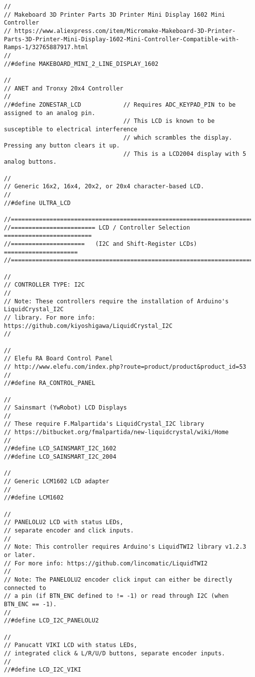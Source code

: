 \begin{lstlisting}
//
// Makeboard 3D Printer Parts 3D Printer Mini Display 1602 Mini Controller
// https://www.aliexpress.com/item/Micromake-Makeboard-3D-Printer-Parts-3D-Printer-Mini-Display-1602-Mini-Controller-Compatible-with-Ramps-1/32765887917.html
//
//#define MAKEBOARD_MINI_2_LINE_DISPLAY_1602

//
// ANET and Tronxy 20x4 Controller
//
//#define ZONESTAR_LCD            // Requires ADC_KEYPAD_PIN to be assigned to an analog pin.
                                  // This LCD is known to be susceptible to electrical interference
                                  // which scrambles the display.  Pressing any button clears it up.
                                  // This is a LCD2004 display with 5 analog buttons.

//
// Generic 16x2, 16x4, 20x2, or 20x4 character-based LCD.
//
//#define ULTRA_LCD

//=============================================================================
//======================== LCD / Controller Selection =========================
//=====================   (I2C and Shift-Register LCDs)   =====================
//=============================================================================

//
// CONTROLLER TYPE: I2C
//
// Note: These controllers require the installation of Arduino's LiquidCrystal_I2C
// library. For more info: https://github.com/kiyoshigawa/LiquidCrystal_I2C
//

//
// Elefu RA Board Control Panel
// http://www.elefu.com/index.php?route=product/product&product_id=53
//
//#define RA_CONTROL_PANEL

//
// Sainsmart (YwRobot) LCD Displays
//
// These require F.Malpartida's LiquidCrystal_I2C library
// https://bitbucket.org/fmalpartida/new-liquidcrystal/wiki/Home
//
//#define LCD_SAINSMART_I2C_1602
//#define LCD_SAINSMART_I2C_2004

//
// Generic LCM1602 LCD adapter
//
//#define LCM1602

//
// PANELOLU2 LCD with status LEDs,
// separate encoder and click inputs.
//
// Note: This controller requires Arduino's LiquidTWI2 library v1.2.3 or later.
// For more info: https://github.com/lincomatic/LiquidTWI2
//
// Note: The PANELOLU2 encoder click input can either be directly connected to
// a pin (if BTN_ENC defined to != -1) or read through I2C (when BTN_ENC == -1).
//
//#define LCD_I2C_PANELOLU2

//
// Panucatt VIKI LCD with status LEDs,
// integrated click & L/R/U/D buttons, separate encoder inputs.
//
//#define LCD_I2C_VIKI


\end{lstlisting}

